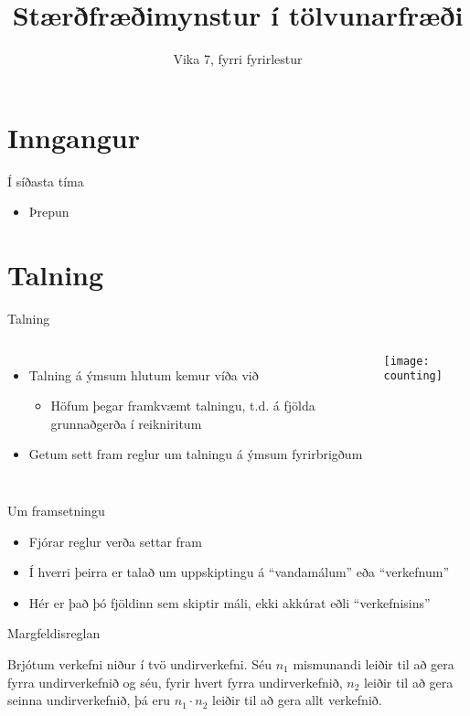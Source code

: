 \documentclass{beamer}
\title{Stærðfræðimynstur í tölvunarfræði}
\subtitle{Vika 7, fyrri fyrirlestur}
\begin{document}
\begin{frame}
\titlepage
\end{frame}


\section{Inngangur}

\begin{frame}{Í síðasta tíma}
    \begin{itemize}
        \item Þrepun
    \end{itemize}
\end{frame}

\section{Talning}

\begin{frame}{Talning}
\begin{columns}
\begin{itemize}
 \item Talning á ýmsum hlutum kemur víða við
 \begin{itemize}
  \item Höfum þegar framkvæmt talningu, t.d. á fjölda grunnaðgerða í reikniritum
 \end{itemize}
 \item Getum sett fram reglur um talningu á ýmsum fyrirbrigðum
\end{itemize}
\begin{center}
\texttt{[image: counting]}
\end{center}
\end{columns}
\end{frame}

\begin{frame}{Um framsetningu}
\begin{itemize}
 \item Fjórar reglur verða settar fram
 \item Í hverri þeirra er talað um uppskiptingu á ``vandamálum'' eða ``verkefnum''
 \item Hér er það þó fjöldinn sem skiptir máli, ekki akkúrat eðli ``verkefnisins''
\end{itemize}
\end{frame}


\begin{frame}{Margfeldisreglan}
\begin{tcolorbox}[title=Margfeldisreglan]
Brjótum verkefni niður í tvö undirverkefni. Séu $n_1$ mismunandi leiðir til að gera fyrra undirverkefnið og séu, fyrir hvert fyrra undirverkefnið, $n_2$ leiðir til að gera seinna undirverkefnið, þá eru $n_1 \cdot n_2$ leiðir til að gera allt verkefnið.
\end{tcolorbox}
\end{frame}
\end{document}
